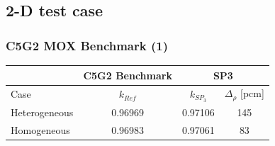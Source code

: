 \subsection{2-D test case}
\begin{frame}
\frametitle{C5G2 MOX Benchmark (1)}
	\begin{table}[htbp!]
	\centering
	\begin{tabular}{lccc}
	\toprule
	 & C5G2 Benchmark      & \multicolumn{2}{c}{SP3}          \\
	\midrule
	Case & $k_{Ref}$       & $k_{SP_3}$ & $\Delta_\rho$ [pcm] \\
	\midrule
	Heterogeneous & 0.96969  & 0.97106  & 145  \\
	Homogeneous   & 0.96983  & 0.97061  &  83  \\
	\bottomrule
	\end{tabular}
	\label{tab:2d-keff}
	\end{table}
\end{frame}

\begin{frame}
\frametitle{C5G2 MOX Benchmark (2)}
	\begin{figure}[htbp!]
		\begin{center}
			\texttt{[image: \{../C5G2-benchmark/output-2g]}}
		\end{center}
		\caption{.}
	\end{figure}
\end{frame}
